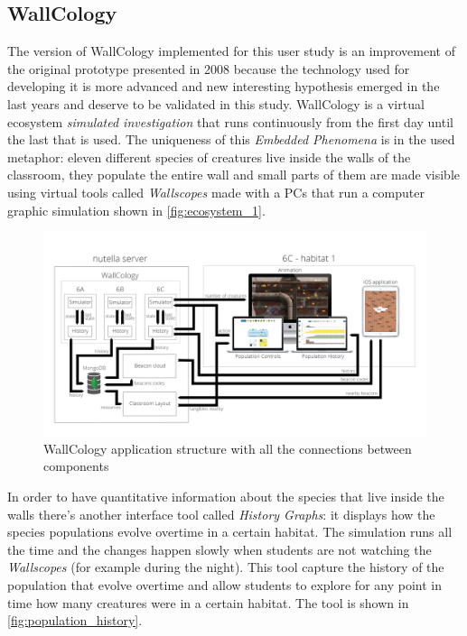 \subsection{WallCology}
The version of WallCology implemented for this user study is an improvement of the original prototype presented in 2008 because the technology used for developing it is more advanced and new interesting hypothesis emerged in the last years and deserve to be validated in this study. WallCology is a virtual ecosystem \textit{simulated investigation} that runs continuously from the first day until the last that is used. The uniqueness of this \textit{Embedded Phenomena} is in the used metaphor: eleven different species of creatures live inside the walls of the classroom, they populate the entire wall and small parts of them are made visible using virtual tools called \textit{Wallscopes} made with a PCs that run a computer graphic simulation shown in \ref{fig:ecosystem_1}. 

\begin{figure}
\centering
\includegraphics[width=6in]{images/wallcology-structure.png}
\caption{WallCology application structure with all the connections between components}
\label{fig:wallscopes}
\end{figure}

In order to have quantitative information about the species that live inside the walls there's another interface tool called \textit{History Graphs}: it displays how the species populations evolve overtime in a certain habitat. The simulation runs all the time and the changes happen slowly when students are not watching the \textit{Wallscopes} (for example during the night). This tool capture the history of the population that evolve overtime and allow students to explore for any point in time how many creatures were in a certain habitat. The tool is shown in \ref{fig:population_history}.

